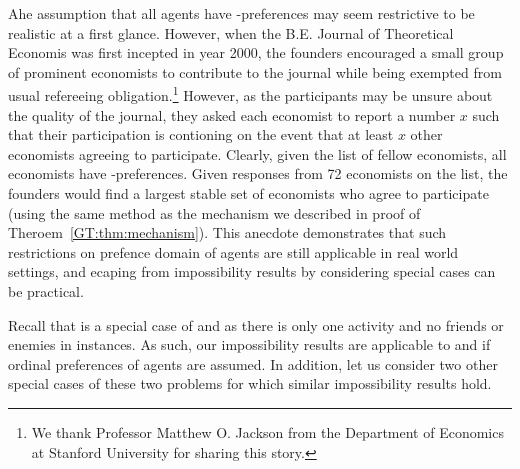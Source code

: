 Ahe assumption that all agents have \INC-preferences may seem restrictive to be realistic at a first glance. However, when the B.E. Journal of Theoretical Economis was first incepted in year 2000, the founders encouraged a small group of prominent economists to contribute to the journal while being exempted from usual refereeing obligation.\footnote{We thank Professor Matthew O. Jackson from the Department of Economics at Stanford University for sharing this story.} However, as the participants may be unsure about the quality of the journal, they asked each economist to report a number $x$ such that their participation is contioning on the event that at least $x$ other economists agreeing to participate. Clearly, given the list of fellow economists, all economists have \INC-preferences. Given responses from 72 economists on the list, the founders would find a largest stable set of economists who agree to participate (using the same method as the mechanism we described in proof of Theroem~\ref{GT:thm:mechanism}). This anecdote demonstrates that such restrictions on prefence domain of agents are still applicable in real world settings, and ecaping from impossibility results by considering special cases can be practical.


Recall that \AOIPs is a special case of \GASPs and \SIPs as there is only one activity and no friends or enemies in \AOIPs instances. As such, our impossibility results are applicable to \GASPs and \SIPs if ordinal preferences of agents are assumed. In addition, let us consider two other special cases of these two problems for which similar impossibility results hold.

